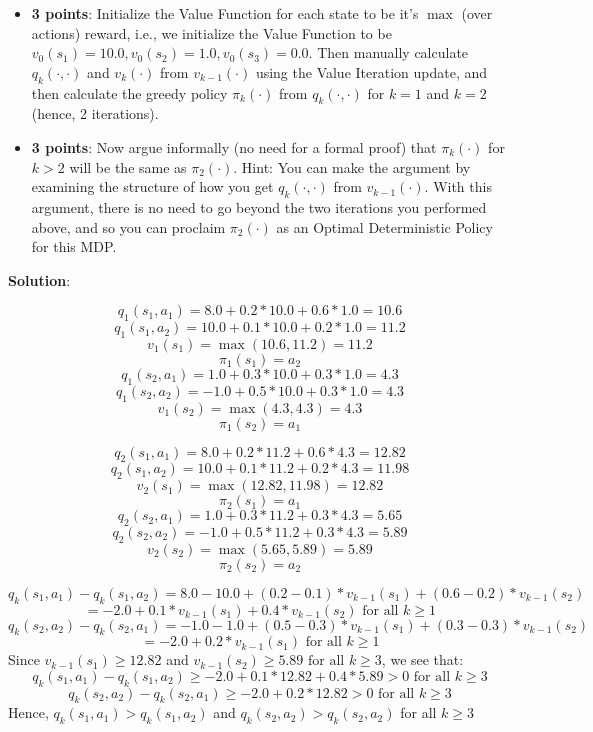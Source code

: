 \documentclass[12pt]{exam}
\begin{document}
\begin{questions}
\begin{itemize}
\item {\bf 3 points}: Initialize the Value Function for each state to be it's $\max$ (over actions) reward, i.e., we initialize the Value Function to be $v_0(s_1) = 10.0, v_0(s_2) = 1.0, v_0(s_3) = 0.0$. Then manually calculate $q_k(\cdot, \cdot)$ and $v_k(\cdot)$ from $v_{k - 1}( \cdot)$ using the Value Iteration update, and then calculate the greedy policy $\pi_k(\cdot)$ from $q_k(\cdot, \cdot)$ for $k = 1$ and $k = 2$ (hence, 2 iterations).

\item {\bf 3 points}: Now argue informally (no need for a formal proof) that $\pi_k(\cdot)$ for $k > 2$ will be the same as $\pi_2(\cdot)$. Hint: You can make the argument by examining the structure of how you get $q_k(\cdot, \cdot)$ from $v_{k-1}(\cdot)$. With this argument, there is no need to go beyond the two iterations you performed above, and so you can proclaim $\pi_2(\cdot)$ as an Optimal Deterministic Policy for this MDP.
\end{itemize}

{\bf Solution}:

$$q_1(s_1, a_1) = 8.0 + 0.2 * 10.0 + 0.6 * 1.0 = 10.6$$
$$q_1(s_1, a_2) = 10.0 + 0.1 * 10.0 + 0.2 * 1.0 = 11.2$$
$$v_1(s_1) = \max(10.6, 11.2) = 11.2$$
$$\pi_1(s_1) = a_2$$
$$q_1(s_2, a_1) = 1.0 + 0.3 * 10.0 + 0.3 * 1.0 = 4.3$$
$$q_1(s_2, a_2) = -1.0 + 0.5 * 10.0 + 0.3 * 1.0 = 4.3$$
$$v_1(s_2) = \max(4.3, 4.3) = 4.3$$
$$\pi_1(s_2) = a_1$$

$$q_2(s_1, a_1) = 8.0 + 0.2 * 11.2 + 0.6 * 4.3 = 12.82$$
$$q_2(s_1, a_2) = 10.0 + 0.1 * 11.2 + 0.2 * 4.3 = 11.98$$
$$v_2(s_1) = \max(12.82, 11.98) = 12.82$$
$$\pi_2(s_1) = a_1$$
$$q_2(s_2, a_1) = 1.0 + 0.3 * 11.2 + 0.3 * 4.3 = 5.65$$
$$q_2(s_2, a_2) = -1.0 + 0.5 * 11.2 + 0.3 * 4.3 = 5.89$$
$$v_2(s_2) = \max(5.65, 5.89) = 5.89$$
$$\pi_2(s_2) = a_2$$

$$q_k(s_1, a_1) - q_k(s_1, a_2) = 8.0 - 10.0 + (0.2 - 0.1) * v_{k-1}(s_1) + (0.6 - 0.2) * v_{k-1}(s_2)$$
$$ = -2.0 + 0.1 * v_{k-1}(s_1) + 0.4 * v_{k-1}(s_2)\mbox{ for all } k \geq 1$$
$$q_k(s_2, a_2) - q_k(s_2, a_1) = -1.0 - 1.0 + (0.5 - 0.3) * v_{k-1}(s_1) + (0.3 - 0.3) * v_{k-1}(s_2)$$
$$ = -2.0 + 0.2 * v_{k-1}(s_1) \mbox{ for all } k \geq 1$$
Since $v_{k-1}(s_1) \geq 12.82 $ and $v_{k-1}(s_2) \geq 5.89 \mbox{ for all } k \geq 3$, we see that:
$$q_k(s_1, a_1) - q_k(s_1, a_2) \geq -2.0 + 0.1 * 12.82 + 0.4 * 5.89 > 0 \mbox{ for all } k \geq 3$$
$$q_k(s_2, a_2) - q_k(s_2, a_1) \geq -2.0 + 0.2 * 12.82 > 0 \mbox{ for all } k \geq 3$$
Hence, $q_k(s_1, a_1) > q_k(s_1, a_2)$ and $q_k(s_2, a_2) > q_k(s_2, a_2)$ for all $k \geq 3$


\end{questions}
\end{document}
